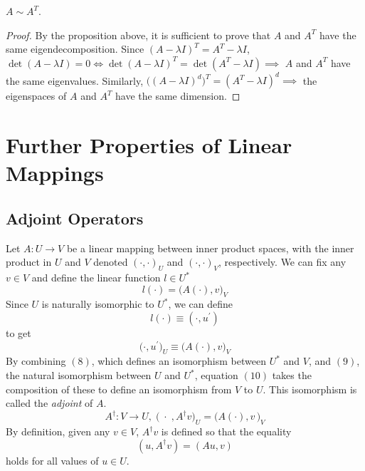 \documentclass{article}
\begin{document}
    \begin{theorem}
    $A \sim A^T$. 
    \end{theorem}
    \begin{proof}
    By the proposition above, it is sufficient to prove that $A$ and $A^T$ have the same eigendecomposition. Since $(A - \lambda I)^T = A^T - \lambda I$, $\det{(A - \lambda I)} = 0 \iff \det{(A - \lambda I)^T} = \det{(A^T - \lambda I)} \implies $ $A$ and $A^T$ have the same eigenvalues. Similarly, $\big( (A - \lambda I)^d \big)^T = (A^T - \lambda I)^d \implies$ the eigenspaces of $A$ and $A^T$ have the same dimension. 
    \end{proof}

\section{Further Properties of Linear Mappings}

  \subsection{Adjoint Operators}

    \begin{definition}
    Let $A: U \longrightarrow V$ be a linear mapping between inner product spaces, with the inner product in $U$ and $V$ denoted $(\cdot,\cdot)_U$ and $(\cdot,\cdot)_V$, respectively. We can fix any $v \in V$ and define the linear function $l \in U^*$
    \begin{equation}
        l(\cdot) = \big(A(\cdot), v\big)_V
    \end{equation}
    Since $U$ is naturally isomorphic to $U^*$, we can define
    \begin{equation}
        l(\cdot) \equiv (\cdot, u^\prime)
    \end{equation} 
    to get 
    \begin{equation}
        \big(\cdot, u^\prime \big)_U \equiv \big(A(\cdot), v \big)_V
    \end{equation}
    By combining $(8)$, which defines an isomorphism between $U^*$ and $V$, and $(9)$, the natural isomorphism between $U$ and $U^*$, equation $(10)$ takes the composition of these to define an isomorphism from $V$ to $U$. This isomorphism is called the \textit{adjoint} of $A$. 
    \[A^\dagger: V \longrightarrow U, \;  \big(\; \cdot \;, A^\dagger v \big)_U = \big( A(\cdot), v \,\big)_V \]
    By definition, given any $v \in V$, $A^\dagger v$ is defined so that the equality
    \[(u, A^\dagger v) = (A u, v)\]
    holds for all values of $u \in U$. 
    \end{definition}
\end{document}
